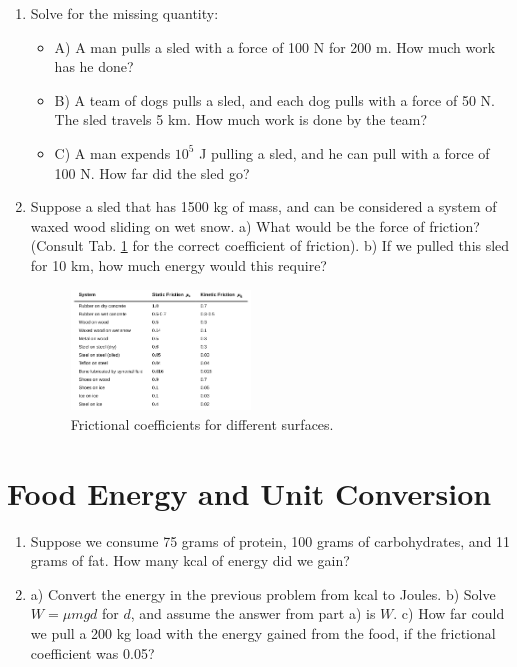 \documentclass[10pt]{article}
\begin{document}
\begin{enumerate}
\item Solve for the missing quantity:
\begin{itemize}
\item A) A man pulls a sled with a force of 100 N for 200 m.  How much work has he done?
\item B) A team of dogs pulls a sled, and each dog pulls with a force of 50 N.  The sled travels 5 km.  How much work is done by the team?
\item C) A man expends $10^5$ J pulling a sled, and he can pull with a force of 100 N.  How far did the sled go? 
\end{itemize} \vspace{3cm}
\item Suppose a sled that has 1500 kg of mass, and can be considered a system of waxed wood sliding on wet snow.  a) What would be the force of friction?  (Consult Tab. \ref{fig:friction} for the correct coefficient of friction).  b) If we pulled this sled for 10 km, how much energy would this require?  \vspace{2cm}
\begin{figure}[hb]
\centering
\includegraphics[width=0.45\textwidth]{friction.png}
\caption{\label{fig:friction} Frictional coefficients for different surfaces.}
\end{figure}
\end{enumerate}

\section{Food Energy and Unit Conversion}

\begin{enumerate}
\item Suppose we consume 75 grams of protein, 100 grams of carbohydrates, and 11 grams of fat.  How many kcal of energy did we gain? \\ \vspace{1cm}
\item a) Convert the energy in the previous problem from kcal to Joules.  b) Solve $W = \mu m g d$ for $d$, and assume the answer from part a) is $W$.  c) How far could we pull a 200 kg load with the energy gained from the food, if the frictional coefficient was 0.05? \\ \vspace{1cm}
\end{enumerate}
\end{document}

